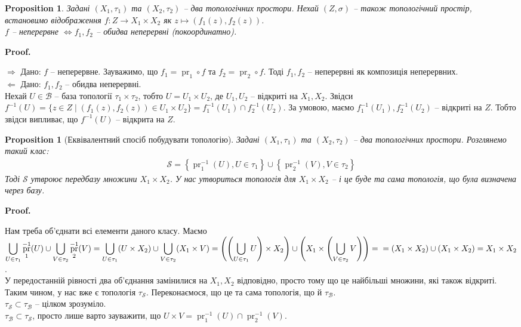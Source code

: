 \documentclass[a4paper, 10pt]{article}
\makeatletter
\def\rightproof{$\boxed{\Rightarrow}$ }
\def\leftproof{$\boxed{\Leftarrow}$ }
\theoremstyle{theoremdd}
\newtheorem{proposition}[theorem]{Proposition}
\DeclareMathOperator{\pr}{pr}
\renewenvironment{proof}[1][Proof.\\]{\par
\pushQED{\hfill \qed}%
\normalfont \topsep6\p@\@plus6\p@\relax
\trivlist
\item\relax
{\bfseries
#1\@addpunct{.}}\hspace\labelsep\ignorespaces
}{%
\popQED\endtrivlist\@endpefalse
}
\makeatother
\begin{document}
\begin{proposition}
Задані $(X_1,\tau_1)$ та $(X_2,\tau_2)$ -- два топологічних простори. Нехай $(Z,\sigma)$ -- також топологічний простір, встановимо відображення $f \colon Z \to X_1 \times X_2$ як $z \mapsto (f_1(z),f_2(z))$.\\
$f$ -- неперервне $\iff f_1,f_2$ -- обидва неперервні (покоординатно).
\end{proposition}

\begin{proof}
\rightproof Дано: $f$ -- неперервне. Зауважимо, що $f_1 = \pr_1 \circ f$ та $f_2 = \pr_2 \circ f$. Тоді $f_1,f_2$ -- неперервні як композиція неперервних.
\bigskip \\
\leftproof Дано: $f_1,f_2$ -- обидва неперервні.\\
Нехай $U \in \mathcal{B}$ -- база топології $\tau_1 \times \tau_2$, тобто $U = U_1 \times U_2$, де $U_1,U_2$ -- відкриті на $X_1,X_2$. Звідси $f^{-1}(U) = \{ z \in Z \mid (f_1(z),f_2(z)) \in U_1 \times U_2\} = f_1^{-1}(U_1) \cap f_2^{-1}(U_2)$. За умовою, маємо $f_1^{-1}(U_1), f_2^{-1}(U_2)$ -- відкриті на $Z$. Тобто звідси випливає, що $f^{-1}(U)$ -- відкрита на $Z$.
\end{proof}

\begin{proposition}[Еквівалентний спосіб побудувати топологію]
Задані $(X_1,\tau_1)$ та $(X_2,\tau_2)$ -- два топологічних простори. Розглянемо такий клас:
\begin{align*}
\mathcal{S} = \left\{ \pr_1^{-1}(U), U \in \tau_1 \right\} \cup \left\{ \pr_2^{-1}(V), V \in \tau_2 \right\}
\end{align*}
Тоді $\mathcal{S}$ утвроює передбазу множини $X_1 \times X_2$. У нас утвориться топологія для $X_1 \times X_2$ -- і це буде та сама топологія, що була визначена через базу.
\end{proposition}

\begin{proof}
Нам треба об'єднати всі елементи даного класу. Маємо\\
$\displaystyle\bigcup_{U \in \tau_1} \pr_1^{-1}(U) \cup \bigcup_{V \in \tau_2} \pr_2^{-1}(V) = \bigcup_{U \in \tau_1} (U \times X_2) \cup \bigcup_{V \in \tau_2} (X_1 \times V) = \left(\left( \bigcup_{U \in \tau_1} U \right) \times X_2\right) \cup \left( X_1 \times \left( \bigcup_{V \in \tau_2} V \right)\right) = \\
= (X_1 \times X_2) \cup (X_1 \times X_2) = X_1 \times X_2$.\\
У передостанній рівності два об'єднання замінилися на $X_1,X_2$ відповідно, просто тому що це найбільші множини, які також відкриті.\\
Таким чином, у нас вже є топологія $\tau_\mathcal{S}$. Переконаємося, що це та сама топологія, що й $\tau_{\mathcal{B}}$.\\
$\tau_{\mathcal{S}} \subset \tau_{\mathcal{B}}$ -- цілком зрозуміло.\\
$\tau_{\mathcal{B}} \subset \tau_{\mathcal{S}}$, просто лише варто зауважити, що $U \times V = \pr_1^{-1}(U) \cap \pr_2^{-1}(V)$.
\end{proof}
\end{document}

